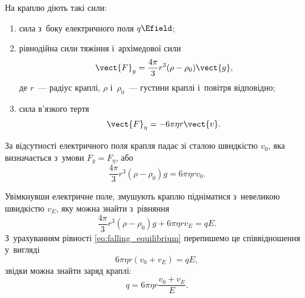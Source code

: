 На краплю діють такі сили:
\begin{enumerate}
	\item сила з~боку електричного поля $q\Efield$;
	\item рівнодійна сили тяжіння і~архімедової сили
	\begin{equation}\label{eq:gravity_force}
		\vect{F}_{g} = \frac{4\pi}{3}r^3(\rho - \rho_0)\vect{g},
	\end{equation}
	де $r$~--- радіус краплі, $\rho$ і~$\rho_0$~--- густини краплі і~повітря відповідно;
	\item сила в'язкого тертя
	\begin{equation}\label{eq:viscous_force}
		\vect{F}_{\eta} = -6\pi\eta r\vect{v}.
	\end{equation}
\end{enumerate}

За відсутності електричного поля крапля падає зі сталою швидкістю $v_0$, яка визначається з~умови $F_g = F_\eta$, або
\begin{equation}\label{eq:falling_equilibrium}
	\frac{4\pi}{3}r^3(\rho - \rho_0)g = 6\pi\eta r v_0.
\end{equation}

Увімкнувши електричне поле, змушують краплю підніматися з~невеликою швидкістю $v_E$, яку можна знайти з~рівняння
\begin{equation}\label{eq:rising_equilibrium}
	\frac{4\pi}{3}r^3(\rho - \rho_0)g + 6\pi\eta r v_E = qE.
\end{equation}
З~урахуванням рівності \eqref{eq:falling_equilibrium} перепишемо це співвідношення у~вигляді
\begin{equation}\label{eq:charge_balance}
	6\pi\eta r(v_0 + v_E) = qE,
\end{equation}
звідки можна знайти заряд краплі:
\begin{equation}\label{eq:charge_drop}
	q = 6\pi\eta r\frac{v_0 + v_E}{E}.
\end{equation}

